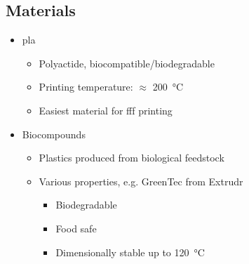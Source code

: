 \documentclass[aspectratio=169]{beamer}
\begin{document}
\subsection{Materials}
\begin{frame}
    \begin{itemize}
        \item \acs{pla}
              \begin{itemize}
                  \item Polyactide, biocompatible/biodegradable
                  \item Printing temperature: $\approx$ \SI{200}{\celsius}
                  \item Easiest material for \acs{fff} printing
              \end{itemize}
        \item Biocompounds
              \begin{itemize}
                  \item Plastics produced from biological feedstock
                  \item Various properties, e.g. GreenTec from Extrudr
                        \begin{itemize}
                            \item Biodegradable
                            \item Food safe
                            \item Dimensionally stable up to \SI{120}{\celsius}
                        \end{itemize}
              \end{itemize}
    \end{itemize}
\end{frame}
\end{document}
